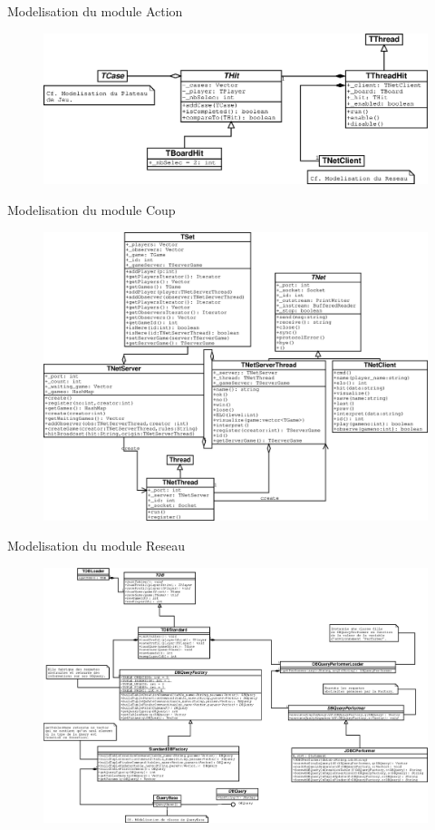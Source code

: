 \documentclass[french,12pt]{report}
\begin{document}
\begin{center}
Modelisation du module Action

\pagebreak

\begin{figure}[h]
\includegraphics[width=16cm]{MCoups.eps}
\end{figure}

Modelisation du module Coup

\pagebreak

\begin{figure}[h]
\includegraphics[width=16cm]{MRe.eps}
\end{figure}

Modelisation du module Reseau

\pagebreak

\begin{figure}[h]
\includegraphics[width=16cm, angle=90]{BDserveur.eps}
\end{figure}


\end{center}
\end{document}
